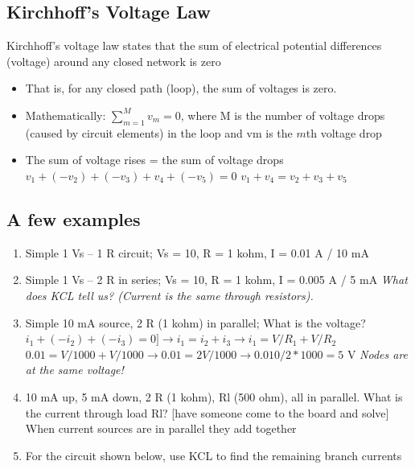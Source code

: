 \documentclass[11pt]{book}
\begin{document}
\subsection{Kirchhoff's Voltage Law}
Kirchhoff's voltage law states that the sum of electrical potential differences (voltage) around any closed network is zero
\begin{itemize}
	\item That is, for any closed path (loop), the sum of voltages is zero.
	\item Mathematically: $\sum_{m=1}^{M} v_m = 0$, where M is the number of voltage drops (caused by circuit elements) in the loop and vm is the $m$th voltage drop
	\item The sum of voltage rises = the sum of voltage drops
	\subitem $v_1 + (-v_2) + (-v_3) + v_4 + (-v_5) = 0$
	\subitem $v_1 + v_4 = v_2 +v_3 + v_5$
	
\end{itemize}

\subsection{A few examples}
\begin{enumerate}
	\item Simple 1 Vs – 1 R circuit; Vs = 10, R = 1 kohm, I = 0.01 A / 10 mA
	\item Simple 1 Vs – 2 R in series; Vs = 10, R = 1 kohm, I = 0.005 A / 5 mA
	\subitem \textit{What does KCL tell us? (Current is the same through  resistors). }
	\item Simple 10 mA source, 2 R (1 kohm) in parallel; What is the voltage?
	\subitem $i_1 + (-i_2) + (-i_3) = 0 ] \rightarrow i_1 = i_2 + i_3 \rightarrow i_1 = V/R_1 + V/R_2$ 
	\subitem $0.01 = V/1000 + V/1000 \rightarrow 0.01 = 2V/1000 \rightarrow 0.010/2*1000 = 5$ V
	\subitem \textit{Nodes are at the same voltage!}
	\item 10 mA up, 5 mA down, 2 R (1 kohm), Rl (500 ohm), all in parallel. What is the current through load Rl? [have someone come to the board and solve]
	\subitem When current sources are in parallel they add together 
	\item For the circuit shown below, use KCL to find the remaining branch currents
\end{enumerate}
\end{document}
